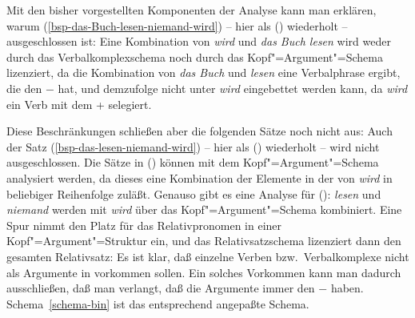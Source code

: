 Mit den bisher vorgestellten Komponenten der Analyse kann man erklären, warum
(\ref{bsp-das-Buch-lesen-niemand-wird}) -- hier als () wiederholt --
ausgeschlossen ist:
\z
Eine Kombination von \emph{wird} und \emph{das Buch lesen} wird weder durch das Verbalkomplexschema
noch durch das Kopf"=Argument"=Schema lizenziert, da die Kombination von \emph{das Buch} und \emph{lesen} 
eine Verbalphrase ergibt, die den \lexw $-$ hat, 
und demzufolge nicht unter \emph{wird} eingebettet werden kann, da \emph{wird} ein Verb mit
dem \lexw + selegiert.

Diese Beschränkungen schließen aber die folgenden Sätze noch nicht aus:
\eal
{}
\zl
Auch der Satz (\ref{bsp-das-lesen-niemand-wird}) -- hier als () wiederholt --
wird nicht ausgeschlossen.
\z
Die Sätze in () können mit dem Kopf"=Argument"=Schema analysiert werden,
da dieses eine Kombination der Elemente in der \subcatl von \emph{wird} in beliebiger
Reihenfolge zuläßt. Genauso gibt es eine Analyse für (): \emph{lesen} und \emph{niemand}
werden mit \emph{wird} über das Kopf"=Argument"=Schema kombiniert. Eine Spur nimmt den Platz
für das Relativpronomen in einer Kopf"=Argument"=Struktur ein, und das Relativsatzschema lizenziert
dann den gesamten Relativsatz:
\z
Es ist klar, daß einzelne Verben bzw.\ Verbalkomplexe nicht als Argumente in \kasen
vorkommen sollen. Ein solches Vorkommen kann man dadurch ausschließen, daß man verlangt,
daß die Argumente immer den \lexw $-$ haben. Schema~\ref{schema-bin} ist
das entsprechend angepaßte Schema.

\begin{samepage}
\begin{schema}
\label{schema-bin}
 \impl\\
\onems{
      synsem$|$loc$|$cat$|$subcat \ibox{1} $\oplus$ \ibox{3}\\
      head-dtr$|$cat$|$subcat \ibox{1} $\oplus$ \sliste{ \ibox{2} } $\oplus$ \ibox{3} \\
      non-head-dtrs \sliste{ [ \synsem  \ibox{2} \textrm{[\textsc{lex}  $-$ ]} ] }\\
}
\end{schema}
\end{samepage}


